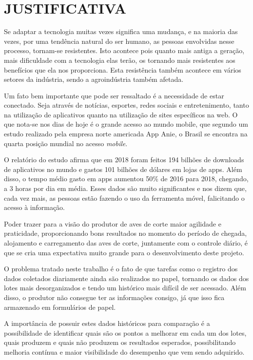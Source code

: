 
\chapter{JUSTIFICATIVA}
\label{chap:justificativa}

Se adaptar a tecnologia muitas vezes significa uma mudança, e na maioria das vezes, por uma tendência natural do ser humano, as pessoas envolvidas nesse processo, tornam-se resistentes. Isto acontece pois quanto mais antiga a geração, mais dificuldade com a tecnologia elas terão, os tornando mais resistentes aos benefícios que ela nos proporciona. Esta resistência também acontece em vários setores da indústria, sendo a agroindústria também afetada. 

Um fato bem importante que pode ser ressaltado é a necessidade de estar conectado. Seja através de notícias, esportes, redes sociais e entretenimento, tanto na utilização de aplicativos quanto na utilização de sites específicos na web. O que nota-se nos dias de hoje é o grande acesso ao mundo mobile, que segundo um estudo realizado pela empresa norte americada App Anie, o Brasil se encontra na quarta posição mundial no acesso \textit{mobile}. \cite{use_app}

O relatório do estudo afirma que em 2018 foram feitos 194 bilhões de downloads de aplicativos no mundo e gastos 101 bilhões de dólares em lojas de apps. Além disso, o tempo médio gasto em apps aumentou 50\% de 2016 para 2018, chegando, a 3 horas por dia em média. Esses dados são muito significantes e nos dizem que, cada vez mais, as pessoas estão fazendo o uso da ferramenta móvel, falicitando o acesso à informação. \cite{use_app}

Poder trazer para a visão do produtor de aves de corte maior agilidade e praticidade, proporcionando bons resultados no momento do período de chegada, alojamento e carregamento das aves de corte, juntamente com o controle diário, é que se cria uma expectativa muito grande para o desenvolvimento deste projeto.

O problema tratado neste trabalho é o fato de que tarefas como o registro dos dados coletados diariamente ainda são realizados no papel, tornando os dados dos lotes mais desorganizados e tendo um histórico mais difícil de ser acessado. Além disso, o produtor não consegue ter as informações consigo, já que isso fica armazenado em formulários de papel.

A importância de possuir estes dados históricos para comparação é a possibilidade de identificar quais são os pontos a melhorar em cada um dos lotes, quais produzem e quais não produzem os resultados esperados, possibilitando melhoria contínua e maior visibilidade do desempenho que vem sendo adquirido.


